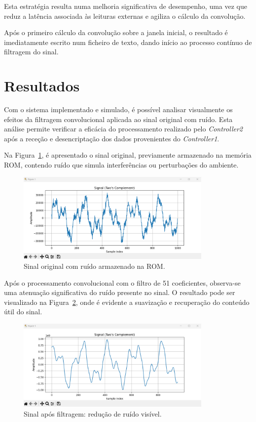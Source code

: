 \documentclass[12pt, a4paper]{article}
\begin{document}
Esta estratégia resulta numa melhoria significativa de desempenho, uma vez que reduz a latência associada às leituras externas e agiliza o cálculo da convolução.

Após o primeiro cálculo da convolução sobre a janela inicial, o resultado é imediatamente escrito num ficheiro de texto, dando início ao processo contínuo de filtragem do sinal.

\section{Resultados}

Com o sistema implementado e simulado, é possível analisar visualmente os efeitos da filtragem convolucional aplicada ao sinal original com ruído. Esta análise permite verificar a eficácia do processamento realizado pelo \textit{Controller2} após a receção e desencriptação dos dados provenientes do \textit{Controller1}.

Na Figura~\ref{fig:sinal_ruido}, é apresentado o sinal original, previamente armazenado na memória ROM, contendo ruído que simula interferências ou perturbações do ambiente.

\begin{figure}[H]
    \centering
    \includegraphics[width=0.85\textwidth]{images/sinal_com_ruido.png}
    \caption{Sinal original com ruído armazenado na ROM.}
    \label{fig:sinal_ruido}
\end{figure}

Após o processamento convolucional com o filtro de 51 coeficientes, observa-se uma atenuação significativa do ruído presente no sinal. O resultado pode ser visualizado na Figura~\ref{fig:sinal_filtrado}, onde é evidente a suavização e recuperação do conteúdo útil do sinal.

\begin{figure}[H]
    \centering
    \includegraphics[width=0.85\textwidth]{images/sinal_filtrado.png}
    \caption{Sinal após filtragem: redução de ruído visível.}
    \label{fig:sinal_filtrado}
\end{figure}
\end{document}
